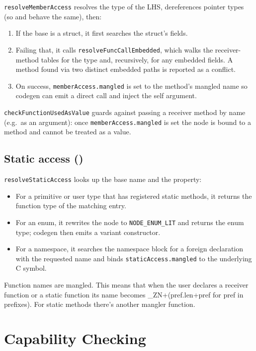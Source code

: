 \texttt{resolveMemberAccess} resolves the type of the LHS, dereferences
pointer types (so  and  behave the same),
then:

\begin{enumerate}
  \item If the base is a struct, it first searches the struct's fields.
  \item Failing that, it calls \texttt{resolveFuncCallEmbedded}, which walks the receiver-method tables for the type and, recursively, for any embedded fields. A method found via two distinct embedded paths is reported as a conflict.
  \item On success, \texttt{memberAccess.mangled} is set to the method's mangled name so codegen can emit a direct call and inject the self argument.
\end{enumerate}

\texttt{checkFunctionUsedAsValue} guards against passing a receiver
method by name (e.g.\ as an argument): once
\texttt{memberAccess.mangled} is set the node is bound to a method and
cannot be treated as a value.

\subsection{Static access ()}

\texttt{resolveStaticAccess} looks up the base name and the property:

\begin{itemize}
  \item For a primitive or user type that has registered static methods, it returns the function type of the matching entry.
  \item For an enum, it rewrites the node to \texttt{NODE\_ENUM\_LIT} and returns the enum type; codegen then emits a variant constructor.
  \item For a namespace, it searches the namespace block for a foreign declaration with the requested name and binds \texttt{staticAccess.mangled} to the underlying C symbol.
\end{itemize}
\begin{note}
Function names are mangled. This means that when the user declares a receiver function or a static function its name becomes \_ZN+(pref.len+pref for pref in prefixes). For static methods there's another mangler function.
\end{note}

\section{Capability Checking}

